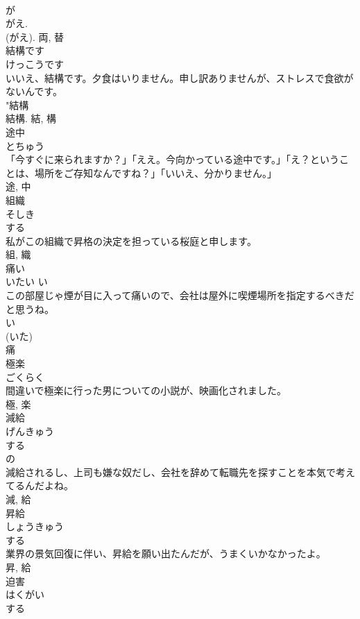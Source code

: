 \documentclass[8pt]{extreport}
\begin{document}
\begin{CJK}{UTF8}{min}
\\	が 
\\	がえ. 
\\	(がえ).	両, 替	
\\	結構です	
\\	けっこうです	
\\	いいえ、結構です。夕食はいりません。申し訳ありませんが、ストレスで食欲がないんです。	
\\	"結構 
\\	結構.	結, 構	
\\	途中	
\\	とちゅう	
\\	「今すぐに来られますか？」「ええ。今向かっている途中です。」「え？ということは、場所をご存知なんですね？」「いいえ、分かりません。」	
\\	途, 中	
\\	組織	
\\	そしき	
\\	する 
\\	私がこの組織で昇格の決定を担っている桜庭と申します。	
\\	組, 織	
\\	痛い	
\\	いたい	い 
\\	この部屋じゃ煙が目に入って痛いので、会社は屋外に喫煙場所を指定するべきだと思うね。	
\\	い 
\\	(いた) 
\\	痛	
\\	極楽	
\\	ごくらく	
\\	間違いで極楽に行った男についての小説が、映画化されました。	
\\	極, 楽	
\\	減給	
\\	げんきゅう	
\\	する 
\\	の 
\\	減給されるし、上司も嫌な奴だし、会社を辞めて転職先を探すことを本気で考えてるんだよね。	
\\	減, 給	
\\	昇給	
\\	しょうきゅう	
\\	する 
\\	業界の景気回復に伴い、昇給を願い出たんだが、うまくいかなかったよ。	
\\	昇, 給	
\\	迫害	
\\	はくがい	
\\	する 

\end{CJK}
\end{document}
